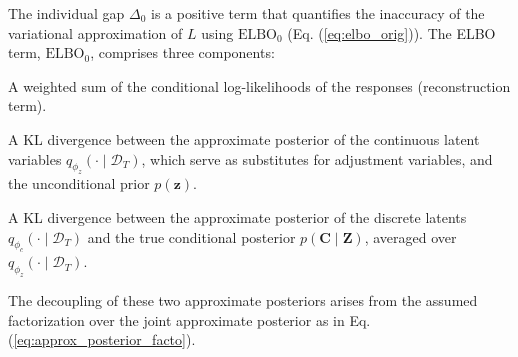 \documentclass[10pt]{article} %
\begin{document}
The individual gap \(\Delta_0\) is a positive term that quantifies the inaccuracy of the variational approximation of \( L \) using \(\mathrm{ELBO_0}\) (Eq. (\ref{eq:elbo_orig})). The ELBO term, $\mathrm{ELBO}_0$, comprises three components:  \begin{inparaenum}[(1)]
\item A weighted sum of the conditional log-likelihoods of the responses (reconstruction term).  
\item A KL divergence between the approximate posterior of the continuous latent variables \( q_{\phi_z}(\cdot \mid \mathcal{D}_T) \), which serve as substitutes for adjustment variables, and the unconditional prior \(p(\mathbf{z})\).  
\item A KL divergence between the approximate posterior of the discrete latents \( q_{\phi_c}(\cdot \mid \mathcal{D}_T) \) and the true conditional posterior \(p(\mathbf{C} \mid \mathbf{Z} )\), averaged over \( q_{\phi_z}(\cdot \mid \mathcal{D}_T) \).  
\end{inparaenum} 
The decoupling of these two approximate posteriors arises from the assumed factorization over the joint approximate posterior as in Eq. (\ref{eq:approx_posterior_facto}).
\end{document}
